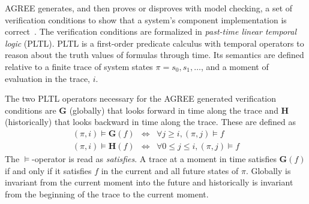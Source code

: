 
\newcommand{\globally}{\ensuremath{\mathbf{G}}}
\newcommand{\historically}{\ensuremath{\mathbf{H}}}
\newcommand{\assumes}{\ensuremath{A}}
\newcommand{\guarantees}{\ensuremath{P}}
\newcommand{\dispatch}{\ensuremath{\mathit{dispatch}}}
\newcommand{\complete}{\ensuremath{\mathit{complete}}}
\newcommand{\same}[1]{\ensuremath{\mathit{same}(#1)}}
\newcommand{\inputs}{\ensuremath{I}}
\newcommand{\outputs}{\ensuremath{O}}
\newcommand{\system}{\ensuremath{S}}
\newcommand{\components}{\ensuremath{C}}
\newcommand{\component}{\ensuremath{c}}
\newcommand{\schedule}{\ensuremath{\phi}}
\newcommand{\valid}{\ensuremath{\mathit{valid}}}
\newcommand{\dpred}{\ensuremath{\delta^\phi}}
\newcommand{\dispred}{\ensuremath{\mathbb{D}^\phi}}
\newcommand{\compred}{\ensuremath{\mathbb{C}^\phi}}
\newcommand{\dispredp}{\ensuremath{\mathbb{D}^{\phi\prime}}}
\newcommand{\compredp}{\ensuremath{\mathbb{C}^{\phi\prime}}}

AGREE generates, and then proves or disproves with model checking, a set of verification conditions to show that a system's component implementation is correct~\cite{agree2013}.
The verification conditions are formalized in \emph{past-time linear temporal logic} (PLTL).
PLTL is a first-order predicate calculus with temporal operators to reason about the truth values of formulas through time.
Its semantics are defined relative to a finite trace of system states $\pi = s_0, s_1, \ldots$, and a moment of evaluation in the trace, $i$.

The two PLTL operators necessary for the AGREE generated verification conditions are $\globally$ (globally) that looks forward in time along the trace and $\historically$ (historically) that looks backward in time along the trace.
These are defined as
\begin{eqnarray*}
 (\pi, i) \models \globally(f) & \iff & \forall j \ge i, (\pi, j) \models f \\
(\pi, i) \models \historically(f) & \iff & \forall 0 \le j \le i, (\pi, j) \models f
\end{eqnarray*}
The $\models$-operator is read as \emph{satisfies}.
A trace at a moment in time satisfies $\globally(f)$ if and only if it satisfies $f$ in the current and all future states of $\pi$.
Globally is invariant from the current moment into the future and historically is invariant from the beginning of the trace to the current moment.

